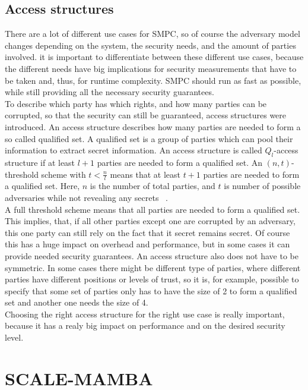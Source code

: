\documentclass[english,runningheads,a4paper]{llncs}[2018/03/10]
\begin{document}
\subsection{Access structures}
There are a lot of different use cases for SMPC, so of course the adversary model changes depending on the system, the security needs, and the amount of parties involved. it is important to differentiate between these different use cases, because the different needs have big implications for security measurements that have to be taken and, thus, for runtime complexity. SMPC should run as fast as possible, while still providing all the necessary security guarantees.\\
To describe which party has which rights, and how many parties can be corrupted, so that the security can still be guaranteed, access structures were introduced.
An access structure describes how many parties are needed to form a so called qualified set. A qualified set is a group of parties which can pool their information to extract secret information. An access structure is called \(Q_l \)-access structure if at least \(l+1\) parties are needed to  form a qualified set. 
An \((n,t)\)-threshold scheme with \(t<\frac{n}{l}\) means that at least \(t+1\) parties are needed to form a qualified set. Here, \(n\) is the number of total parties, and \(t\) is number of possible adversaries while not revealing any secrets ~\cite{MPCBook_threshold}.\\
A full threshold scheme means that all parties are needed to form a qualified set. This implies, that, if all other parties except one are corrupted by an adversary, this one party can still rely on the fact that it secret remains secret. Of course this has a huge impact on overhead and performance, but in some cases it can provide needed security guarantees.
An access structure also does not have to be symmetric. In some cases there might be different type of parties, where different parties have different positions or levels of trust, so it is, for example, possible to specify that some set of parties only has to have the size of 2 to form a qualified set and another one needs the size of 4.\\
Choosing the right access structure for the right use case is really important, because it has a realy big impact on performance and on the desired security level.


\section{SCALE-MAMBA}\label{sec:scalemamba}
\end{document}
